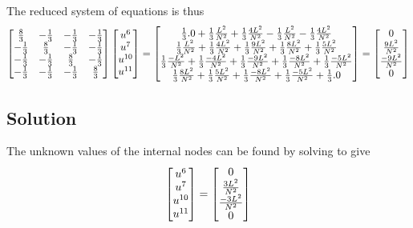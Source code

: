 The reduced system of equations is thus 
\begin{equation}
  \begin{bmatrix}
  \frac{8}{3} & -\frac{1}{3} & -\frac{1}{3} & -\frac{1}{3} \\
  -\frac{1}{3} & \frac{8}{3} & -\frac{1}{3} & -\frac{1}{3} \\
  -\frac{1}{3} & -\frac{1}{3} & \frac{8}{3} & -\frac{1}{3} \\
  -\frac{1}{3} & -\frac{1}{3} & -\frac{1}{3} & \frac{8}{3}
  \end{bmatrix}\begin{bmatrix}
    \nodept{u}{6} \\ \nodept{u}{7} \\ \nodept{u}{10} \\ \nodept{u}{11} 
  \end{bmatrix}=\begin{bmatrix}
  \frac{1}{3}.0+\frac{1}{3}\frac{L^{2}}{N^{2}}+\frac{1}{3}\frac{4L^{2}}{N^{2}}-\frac{1}{3}\frac{L^{2}}{N^{2}}-\frac{1}{3}\frac{4L^{2}}{N^{2}}\\
  \frac{1}{3}\frac{L^{2}}{N^{2}}+\frac{1}{3}\frac{4L^{2}}{N^{2}}+\frac{1}{3}\frac{9L^{2}}{N^{2}}+\frac{1}{3}\frac{8L^{2}}{N^{2}}+\frac{1}{3}\frac{5L^{2}}{N^{2}}\\
  \frac{1}{3}\frac{-L^{2}}{N^{2}}+\frac{1}{3}\frac{-4L^{2}}{N^{2}}+\frac{1}{3}\frac{-9L^{2}}{N^{2}}+\frac{1}{3}\frac{-8L^{2}}{N^{2}}+\frac{1}{3}\frac{-5L^{2}}{N^{2}}\\
  \frac{1}{3}\frac{8L^{2}}{N^{2}}+\frac{1}{3}\frac{5L^{2}}{N^{2}}+\frac{1}{3}\frac{-8L^{2}}{N^{2}}+\frac{1}{3}\frac{-5L^{2}}{N^{2}}+\frac{1}{3}.0
  \end{bmatrix}=\begin{bmatrix}
  0 \\
  \frac{9L^{2}}{N^{2}} \\
  \frac{-9L^{2}}{N^{2}} \\
  0
  \end{bmatrix}
  \label{eqn:FEMTwoDLaplaceReducedSystem}
\end{equation}

\subsection{Solution}
\label{subsec:FEMTwoDLaplaceSolution}

The unknown values of the internal nodes can be found by solving  to give
\begin{equation}
  \begin{bmatrix}
    \nodept{u}{6} \\
    \nodept{u}{7} \\
    \nodept{u}{10} \\
    \nodept{u}{11}    
  \end{bmatrix} = \begin{bmatrix}
    0 \\
    \frac{3L^{2}}{N^{2}} \\
    \frac{-3L^{2}}{N^{2}} \\
    0
  \end{bmatrix}
  \label{eqn:FEMTwoDLaplaceSolution}  
\end{equation}

